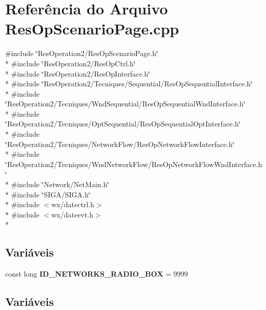 \section{Referência do Arquivo Res\+Op\+Scenario\+Page.\+cpp}
\label{_res_op_scenario_page_8cpp}
{\ttfamily \#include \char`\"{}Res\+Operation2/\+Res\+Op\+Scenario\+Page.\+h\char`\"{}}\\*
{\ttfamily \#include \char`\"{}Res\+Operation2/\+Res\+Op\+Ctrl.\+h\char`\"{}}\\*
{\ttfamily \#include \char`\"{}Res\+Operation2/\+Res\+Op\+Interface.\+h\char`\"{}}\\*
{\ttfamily \#include \char`\"{}Res\+Operation2/\+Tecniques/\+Sequential/\+Res\+Op\+Sequential\+Interface.\+h\char`\"{}}\\*
{\ttfamily \#include \char`\"{}Res\+Operation2/\+Tecniques/\+Wnd\+Sequential/\+Res\+Op\+Sequential\+Wnd\+Interface.\+h\char`\"{}}\\*
{\ttfamily \#include \char`\"{}Res\+Operation2/\+Tecniques/\+Opt\+Sequential/\+Res\+Op\+Sequential\+Opt\+Interface.\+h\char`\"{}}\\*
{\ttfamily \#include \char`\"{}Res\+Operation2/\+Tecniques/\+Network\+Flow/\+Res\+Op\+Network\+Flow\+Interface.\+h\char`\"{}}\\*
{\ttfamily \#include \char`\"{}Res\+Operation2/\+Tecniques/\+Wnd\+Network\+Flow/\+Res\+Op\+Network\+Flow\+Wnd\+Interface.\+h\char`\"{}}\\*
{\ttfamily \#include \char`\"{}Network/\+Net\+Main.\+h\char`\"{}}\\*
{\ttfamily \#include \char`\"{}S\+I\+G\+A/\+S\+I\+G\+A.\+h\char`\"{}}\\*
{\ttfamily \#include $<$wx/datectrl.\+h$>$}\\*
{\ttfamily \#include $<$wx/dateevt.\+h$>$}\\*
\subsection*{Variáveis}
\begin{DoxyCompactItemize}
\item 
const long {\bf I\+D\+\_\+\+N\+E\+T\+W\+O\+R\+K\+S\+\_\+\+R\+A\+D\+I\+O\+\_\+\+B\+OX} = 9999
\end{DoxyCompactItemize}


\subsection{Variáveis}
